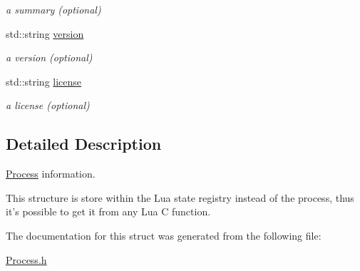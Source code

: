 \begin{DoxyCompactItemize}
\begin{DoxyCompactList}\small\item\em a summary (optional) \end{DoxyCompactList}\item 
\hypertarget{a00030_aefca23469408a503ae8264e8814fc42d}{std\-::string \hyperlink{a00030_aefca23469408a503ae8264e8814fc42d}{version}}\label{a00030_aefca23469408a503ae8264e8814fc42d}

\begin{DoxyCompactList}\small\item\em a version (optional) \end{DoxyCompactList}\item 
\hypertarget{a00030_aa2e07570455743787332bc2286e1305f}{std\-::string \hyperlink{a00030_aa2e07570455743787332bc2286e1305f}{license}}\label{a00030_aa2e07570455743787332bc2286e1305f}

\begin{DoxyCompactList}\small\item\em a license (optional) \end{DoxyCompactList}\end{DoxyCompactItemize}


\subsection{Detailed Description}
\hyperlink{a00052}{Process} information. 

This structure is store within the Lua state registry instead of the process, thus it's possible to get it from any Lua C function. 

The documentation for this struct was generated from the following file\-:\begin{DoxyCompactItemize}
\item 
\hyperlink{a00123}{Process.\-h}\end{DoxyCompactItemize}
